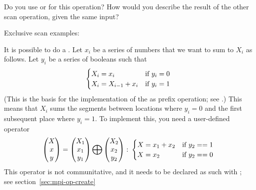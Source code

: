 \begin{exercise}
  Do you use  or  for this operation? How
  would you describe the result of the other scan operation, given the
  same input?
\end{exercise}

Exclusive scan examples:
%
%

It is possible to do a . Let $x_i$ be a series of numbers
that we want to sum to $X_i$ as follows. Let $y_i$ be a series of booleans such that
\[ 
\begin{cases}
  X_i=x_i&\hbox{if $y_i=0$}\\
  X_i=X_{i-1}+x_i&\hbox{if $y_i=1$}
\end{cases}
\]
(This is the basis for the implementation of the 
as prefix operation; see .)
This means that $X_i$ sums the segments between locations where $y_i=0$ and the
first subsequent place where $y_i=1$. To implement this, you need a user-defined operator
\[ 
\begin{pmatrix}  X\\ x\\ y\end{pmatrix}
=
\begin{pmatrix}  X_1\\ x_1\\ y_1\end{pmatrix}
\bigoplus
\begin{pmatrix}  X_2\\ x_2\\ y_2\end{pmatrix}\colon
  \begin{cases}
    X=x_1+x_2&\hbox{if $y_2==1$}\\ X=x_2&\hbox{if $y_2==0$}
  \end{cases}
\]
This operator is not communitative, and it needs to be declared as such
with ; see section~\ref{sec:mpi-op-create}


